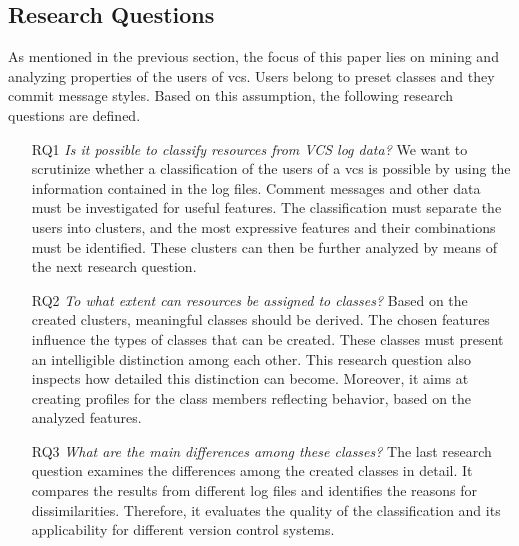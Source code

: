 \subsection{Research Questions}

As mentioned in the previous section, the focus of this paper lies on mining and analyzing properties of the users of \gls{vcs}. Users belong to preset classes and they commit message styles. Based on this assumption, the following research questions are defined.


\begin{itemize} %
      
\item[RQ1] \textit{Is it possible to classify resources from VCS log data?} 
We want to scrutinize whether a classification of the users of a \gls{vcs} is possible by using the information contained in the log files. Comment messages and other data must be investigated for useful features. The classification must separate the users into clusters, and the most expressive features and their combinations must be identified.  These clusters can then be further analyzed by means of the next research question.

\item[RQ2] \textit{To what extent can resources be assigned to classes?}
Based on the created clusters, meaningful classes should be derived. The chosen features influence the types of classes that can be created. These classes must present an intelligible distinction among each other. This research question also inspects how detailed this distinction can become. Moreover, it aims at creating profiles for the class members reflecting behavior, based on the analyzed features.

\item[RQ3] \textit{What are the main differences among these classes?}
The last research question examines the differences among the created classes in detail. It compares the results from different log files and identifies the reasons for dissimilarities. Therefore, it evaluates the quality of the classification and its applicability for different version control systems.

\end{itemize}

